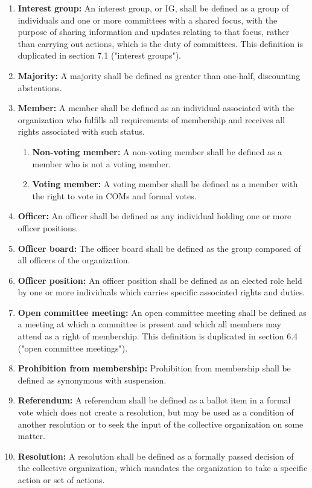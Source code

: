 \documentclass[11pt]{article}
\newcounter{h1}
\newcounter{h2}[h1]
\newcounter{h3}[h2]
\begin{document}
\begin{enumerate}
  \item \textbf{Interest group:} An interest group, or IG, shall be defined as a group of individuals and one or more committees with a shared focus, with the purpose of sharing information and updates relating to that focus, rather than carrying out actions, which is the duty of committees. This definition is duplicated in section 7.1 ("interest groups").  
  \item \textbf{Majority:} A majority shall be defined as greater than one-half, discounting abstentions.  
  \item \textbf{Member:} A member shall be defined as an individual associated with the organization who fulfills all requirements of membership and receives all rights associated with such status.  
  \begin{enumerate}
    \item \textbf{Non-voting member:} A non-voting member shall be defined as a member who is not a voting member.  
    \item \textbf{Voting member:} A voting member shall be defined as a member with the right to vote in COMs and formal votes.  
  \end{enumerate}
  \item \textbf{Officer:} An officer shall be defined as any individual holding one or more officer positions.  
  \item \textbf{Officer board:} The officer board shall be defined as the group composed of all officers of the organization.  
  \item \textbf{Officer position:} An officer position shall be defined as an elected role held by one or more individuals which carries specific associated rights and duties.  
  \item \textbf{Open committee meeting:} An open committee meeting shall be defined as a meeting at which a committee is present and which all members may attend as a right of membership. This definition is duplicated in section 6.4 ("open committee meetings").   
  \item \textbf{Prohibition from membership:} Prohibition from membership shall be defined as synonymous with suspension.  
  \item \textbf{Referendum:} A referendum shall be defined as a ballot item in a formal vote which does not create a resolution, but may be used as a condition of another resolution or to seek the input of the collective organization on some matter.  
  \item \textbf{Resolution:} A resolution shall be defined as a formally passed decision of the collective organization, which mandates the organization to take a specific action or set of actions.  

\end{enumerate}
\end{document}
